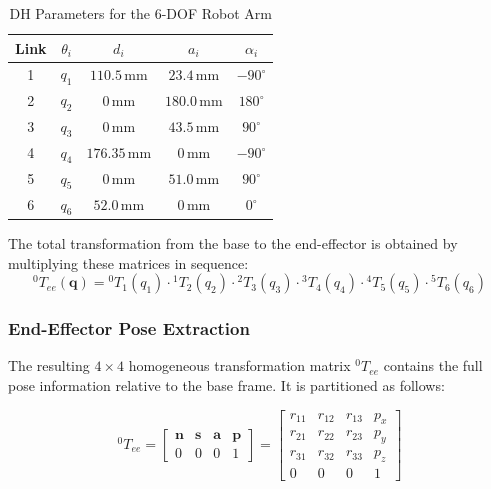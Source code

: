 \documentclass[12pt,a4paper]{report}
\begin{document}
\begin{table}[H]
    \centering
    \begin{tabular}{|c|c|c|c|c|}
        \hline
        \textbf{Link} & $\theta_i$ & $d_i$ & $a_i$ & $\alpha_i$ \\
        \hline
        1 & $q_1$ & $110.5\,$mm & $23.4\,$mm & $-90^\circ$ \\
        2 & $q_2$ & $0\,$mm & $180.0\,$mm & $180^\circ$ \\
        3 & $q_3$ & $0\,$mm & $43.5\,$mm & $90^\circ$ \\
        4 & $q_4$ & $176.35\,$mm & $0\,$mm & $-90^\circ$ \\
        5 & $q_5$ & $0\,$mm & $51.0\,$mm & $90^\circ$ \\
        6 & $q_6$ & $52.0\,$mm & $0\,$mm & $0^\circ$ \\
        \hline
    \end{tabular}
    \caption{DH Parameters for the 6-DOF Robot Arm}
    \label{tab:dh_parameters}
\end{table}

The total transformation from the base to the end-effector is obtained by multiplying these matrices in sequence:
\begin{equation}
    {}^{0}T_{ee}(\mathbf{q}) = {}^{0}T_1(q_1) \cdot {}^{1}T_2(q_2) \cdot {}^{2}T_3(q_3) \cdot {}^{3}T_4(q_4) \cdot {}^{4}T_5(q_5) \cdot {}^{5}T_6(q_6)
\end{equation}

\subsubsection{End-Effector Pose Extraction}

The resulting $4 \times 4$ homogeneous transformation matrix ${}^0T_{ee}$ contains the full pose information relative to the base frame. It is partitioned as follows:

\begin{equation}
    {}^0T_{ee} = \begin{bmatrix}
    \mathbf{n} & \mathbf{s} & \mathbf{a} & \mathbf{p} \\
    0 & 0 & 0 & 1
    \end{bmatrix} = \begin{bmatrix}
    r_{11} & r_{12} & r_{13} & p_x \\
    r_{21} & r_{22} & r_{23} & p_y \\
    r_{31} & r_{32} & r_{33} & p_z \\
    0 & 0 & 0 & 1
    \end{bmatrix}
\end{equation}
\end{document}

